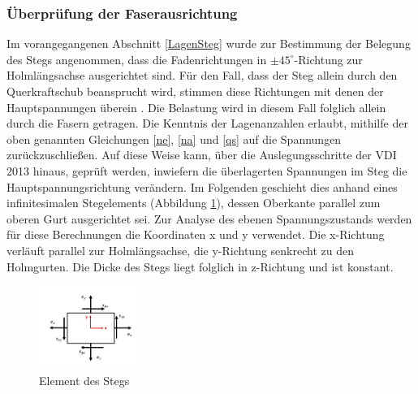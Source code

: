 \subsubsection{Überprüfung der Faserausrichtung}\label{Überprüfung}
Im vorangegangenen Abschnitt \ref{LagenSteg} wurde zur Bestimmung der Belegung des Stegs angenommen, dass die Fadenrichtungen in $ \pm 45^{\circ} $-Richtung zur Holmlängsachse ausgerichtet sind. Für den Fall, dass der Steg allein durch den Querkraftschub beansprucht wird, stimmen diese Richtungen mit denen der Hauptspannungen überein \cite{item16}. Die Belastung wird in diesem Fall folglich allein durch die Fasern getragen. Die Kenntnis der Lagenanzahlen erlaubt, mithilfe der oben genannten Gleichungen \ref{ne}, \ref{na} und \ref{qs} auf die Spannungen zurückzuschließen. Auf diese Weise kann, über die Auslegungsschritte der VDI 2013 hinaus, geprüft werden, inwiefern die überlagerten Spannungen im Steg die Hauptspannungsrichtung verändern. Im Folgenden geschieht dies anhand eines infinitesimalen Stegelements (Abbildung \ref{fig: Element}), dessen Oberkante parallel zum oberen Gurt ausgerichtet sei. Zur Analyse des ebenen Spannungszustands werden für diese Berechnungen die Koordinaten x und y verwendet. Die x-Richtung verläuft parallel zur Holmlängsachse, die y-Richtung senkrecht zu den Holmgurten. Die Dicke des Stegs liegt folglich in z-Richtung und ist konstant.  

\begin{figure}[h]
	\includegraphics[width=0.3\textwidth]{Bilder/Element.jpg}
	\centering
	\caption{Element des Stegs}
	\label{fig: Element}
\end{figure}

